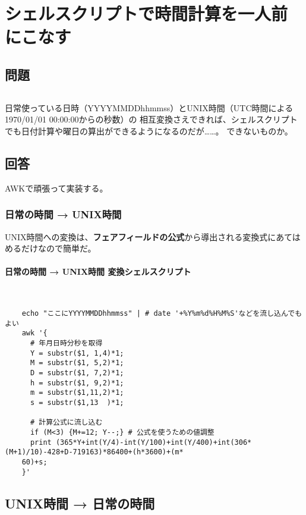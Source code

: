 \section{シェルスクリプトで時間計算を一人前にこなす}
\label{recipe:utconv}

\subsection*{問題}
\noindent
$\!\!\!\!\!$
\begin{grshfboxit}{160.0mm}
	日常使っている日時（YYYYMMDDhhmmss）とUNIX時間（UTC時間による1970/01/01 00:00:00からの秒数）の
	相互変換さえできれば、シェルスクリプトでも日付計算や曜日の算出ができるようになるのだが……。
	できないものか。
\end{grshfboxit}

\subsection*{回答}
AWKで頑張って実装する。

\subsubsection*{日常の時間 → UNIX時間}

UNIX時間への変換は、\textbf{フェアフィールドの公式}から導出される変換式にあてはめるだけなので簡単だ。
\paragraph{日常の時間 → UNIX時間 変換シェルスクリプト} 　\\
\begin{frameboxit}{160.0mm}
\begin{verbatim}
	echo "ここにYYYYMMDDhhmmss" | # date '+%Y%m%d%H%M%S'などを流し込んでもよい
	awk '{
	  # 年月日時分秒を取得
	  Y = substr($1, 1,4)*1;
	  M = substr($1, 5,2)*1;
	  D = substr($1, 7,2)*1;
	  h = substr($1, 9,2)*1;
	  m = substr($1,11,2)*1;
	  s = substr($1,13  )*1;

	  # 計算公式に流し込む
	  if (M<3) {M+=12; Y--;} # 公式を使うための値調整
	  print (365*Y+int(Y/4)-int(Y/100)+int(Y/400)+int(306*(M+1)/10)-428+D-719163)*86400+(h*3600)+(m*
	60)+s;
	}'
\end{verbatim}
\end{frameboxit}

\subsection*{UNIX時間 → 日常の時間}


